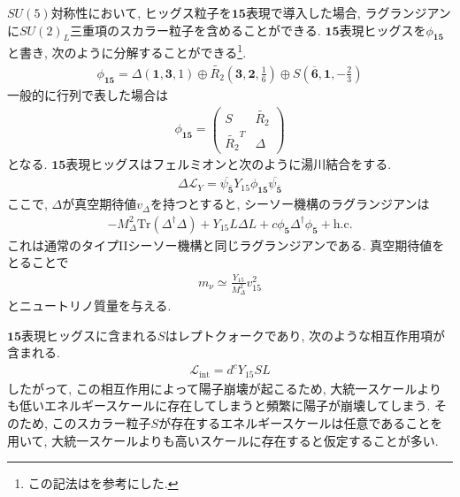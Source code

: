 $SU(5)$対称性において, ヒッグス粒子を$\bm{15}$表現で導入した場合, ラグランジアンに$SU(2)_L$三重項のスカラー粒子を含めることができる\cite{dorsner_phenomenological_2006,dorsner_unification_2005}.
$\bm{15}$表現ヒッグスを$\phi_{\bm{15}}$と書き, 次のように分解することができる\footnote{この記法は\cite{dorsnerPhysicsLeptoquarksPrecision2016}を参考にした.}.
\begin{align}
  \phi_{\bm{15}} = \Delta \left(\bm{1}, \bm{3}, 1\right) \oplus \widetilde{R_2}\left(\bm{3}, \bm{2},\frac{1}{6}\right)\oplus S\left(\overline{\bm{6}}, \bm{1}, -\frac{2}{3}\right)
\end{align}
一般的に行列で表した場合は
\begin{align}
  \phi_{\bm{15}} = \begin{pmatrix}
    S & {\widetilde{R_2}} \\
    \widetilde{R_2}^T & \Delta
  \end{pmatrix}
\end{align}
となる.
$\bm{15}$表現ヒッグスはフェルミオンと次のように湯川結合をする.
\begin{align}
  \Delta\mathcal{L}_Y = \overline{\psi_{\bm{\bar{5}}}} Y_{15} \phi_{\bm{15}}\overline{\psi_{\bm{\bar{5}}}} 
\end{align}
ここで, $\Delta$が真空期待値$v_\Delta$を持つとすると, シーソー機構のラグランジアンは
\begin{align}
  -M_\Delta^2 \mathrm{Tr}(\Delta^\dagger \Delta) + Y_{15} L\Delta L +c \phi_{\bm{5}}\Delta^\dagger \phi_{\bm{5}} +\mathrm{h.c.}\nonumber
\end{align}
これは通常のタイプIIシーソー機構と同じラグランジアンである.
真空期待値をとることで
\begin{align}
  m_\nu \simeq \frac{Y_{15}}{M_\Delta^2}v_{15}^2\nonumber
\end{align}
とニュートリノ質量を与える.

$\bm{15}$表現ヒッグスに含まれる$S$はレプトクォークであり, 次のような相互作用項が含まれる.
\begin{align}
  \mathcal{L}_{\mathrm{int}} = d^c Y_{15} S L\nonumber
\end{align}
したがって, この相互作用によって陽子崩壊が起こるため, 大統一スケールよりも低いエネルギースケールに存在してしまうと頻繁に陽子が崩壊してしまう.
そのため, このスカラー粒子$S$が存在するエネルギースケールは任意であることを用いて, 大統一スケールよりも高いスケールに存在すると仮定することが多い.

